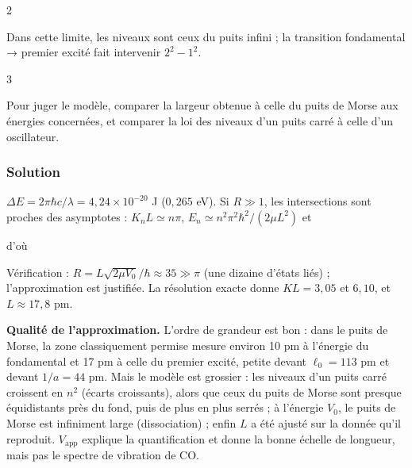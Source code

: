 \documentclass[11pt,a4paper]{article}
\newcommand{\equationajustee}[1]{%
  \sbox{\boiteequation}{$\displaystyle #1$}%
  \ifdim\wd\boiteequation>\linewidth
    \[\resizebox{\linewidth}{!}{\usebox{\boiteequation}}\]%
  \else
    \[#1\]%
  \fi}
\begin{document}
\begin{indication}{2}

Dans cette limite, les niveaux sont ceux du puits infini ; la transition fondamental → premier excité fait intervenir \(2^2-1^2\).

\end{indication}

\begin{indication}{3}

Pour juger le modèle, comparer la largeur obtenue à celle du puits de Morse aux énergies concernées, et comparer la loi des niveaux d'un puits carré à celle d'un oscillateur.

\end{indication}

\hypertarget{solution-24}{%
\subsubsection{Solution}\label{solution-24}}

\(\Delta E = 2\pi\hbar c/\lambda = 4{,}24\times10^{-20}\) J (\(0{,}265\) eV). Si \(R\gg1\), les intersections sont proches des asymptotes : \(K_nL\simeq n\pi\), \(E_n\simeq n^2\pi^2\hbar^2/(2\mu L^2)\) et

\equationajustee{\Delta E\simeq\frac{3\pi^2\hbar^2}{2\mu L^2},}

d'où

\equationajustee{L\simeq\pi\hbar\sqrt{\frac{3}{2\mu\Delta E}}\approx\boxed{18\ \text{pm}}}

Vérification : \(R = L\sqrt{2\mu V_0}/\hbar\approx35\gg\pi\) (une dizaine d'états liés) ; l'approximation est justifiée. La résolution exacte donne \(KL = 3{,}05\) et \(6{,}10\), et \(L\approx17{,}8\) pm.

\textbf{Qualité de l'approximation.} L'ordre de grandeur est bon : dans le puits de Morse, la zone classiquement permise mesure environ 10 pm à l'énergie du fondamental et 17 pm à celle du premier excité, petite devant \(\ell_0 = 113\) pm et devant \(1/a = 44\) pm. Mais le modèle est grossier : les niveaux d'un puits carré croissent en \(n^2\) (écarts croissants), alors que ceux du puits de Morse sont presque équidistants près du fond, puis de plus en plus serrés ; à l'énergie \(V_0\), le puits de Morse est infiniment large (dissociation) ; enfin \(L\) a été ajusté sur la donnée qu'il reproduit. \(V_{\text{app}}\) explique la quantification et donne la bonne échelle de longueur, mais pas le spectre de vibration de CO.
\end{document}
